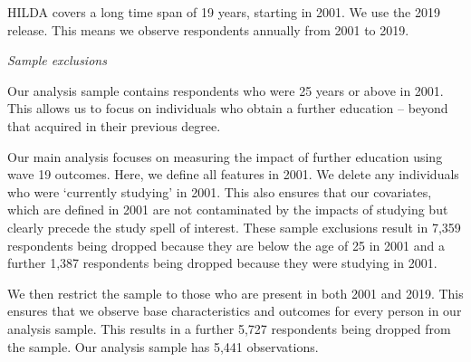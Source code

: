 \documentclass[12pt, a4paper]{article}
\begin{document}
HILDA covers a long time span of 19 years, starting in 2001. We use the 2019 release. This means we observe respondents annually from 2001 to 2019.

\emph{Sample exclusions}

Our analysis sample contains respondents who were 25 years or above in 2001. This allows us to focus on individuals who obtain a further education – beyond that acquired in their previous degree. 

Our main analysis focuses on measuring the impact of further education using wave 19 outcomes. Here, we define all features in 2001. We delete any individuals who were ‘currently studying’ in 2001. This also ensures that our covariates, which are defined in 2001 are not contaminated by the impacts of studying but clearly precede the study spell of interest. These sample exclusions result in 7,359 respondents being dropped because they are below the age of 25 in 2001 and a further 1,387 respondents being dropped because they were studying in 2001.

We then restrict the sample to those who are present in both 2001 and 2019. This ensures that we observe base characteristics and outcomes for every person in our analysis sample. This results in a further 5,727 respondents being dropped from the sample. Our analysis sample has 5,441 observations.


%
\end{document}
